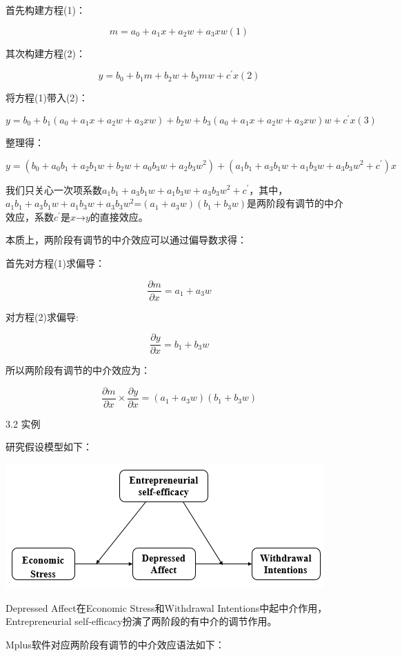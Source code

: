 \documentclass[
]{book}
\begin{document}
首先构建方程(1)：

\[
m=a_{0}+a_{1}x+a_{2}w+a_{3}xw(1)
\]

其次构建方程(2)：

\[
y=b_{0}+b_{1}m+b_{2}w+b_{3}mw+c^{'}x(2)
\]

将方程(1)带入(2)：

\[
y=b_{0}+b_{1}(a_{0}+a_{1}x+a_{2}w+a_{3}xw)+b_{2}w+b_{3}(a_{0}+a_{1}x+a_{2}w+a_{3}xw)w+c^{'}x(3)
\]

整理得：

\[
y=(b_{0}+a_{0}b_{1}+a_{2}b_{1}w+b_{2}w+a_{0}b_{3}w+a_{2}b_{3}w^{2})+(a_{1}b_{1}+a_{3}b_{1}w+a_{1}b_{3}w+a_{3}b_{3}w^{2}+c^{'})x
\]

我们只关心一次项系数\(a_{1}b_{1}+a_{3}b_{1}w+a_{1}b_{3}w+a_{3}b_{3}w^{2}+c^{'}\)，其中，\(a_{1}b_{1}+a_{3}b_{1}w+a_{1}b_{3}w+a_{3}b_{3}w^{2}\)=\((a_{1}+a_{3}w)(b_{1}+b_{3}w)\)是两阶段有调节的中介效应，系数\(c^{'}\)是\(x\)→\(y\)的直接效应。

本质上，两阶段有调节的中介效应可以通过偏导数求得：

首先对方程(1)求偏导：

\[
\frac{\partial m}{\partial x}=a_{1}+a_{3}w
\]

对方程(2)求偏导:

\[
\frac{\partial y}{\partial x}=b_{1}+b_{3}w
\]

所以两阶段有调节的中介效应为：

\[
\frac{\partial m}{\partial x} {\times} \frac{\partial y}{\partial x}=(a_{1}+a_{3}w)(b_{1}+b_{3}w)
\]

3.2 实例

研究假设模型如下：

\includegraphics{figs/11410.png}

Depressed Affect在Economic Stress和Withdrawal Intentions中起中介作用，Entrepreneurial self-efficacy扮演了两阶段的有中介的调节作用。

Mplus软件对应两阶段有调节的中介效应语法如下：
\end{document}
